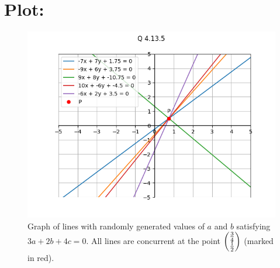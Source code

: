 \documentclass[a4paper, 12pt]{article}
\begin{document}
\section{Plot: }
\begin{figure}[h!]
    \centering
    \includegraphics[width=\columnwidth]{figs/plot.png}
    \caption{Graph of lines with randomly generated values of $a$ and $b$ satisfying $3a + 2b + 4c = 0$. All lines are concurrent at the point $\begin{pmatrix}\frac{3}{4} \\ \frac{1}{2}\end{pmatrix}$ (marked in red).}
    \label{fig:4.13.5}
\end{figure}
\end{document}
